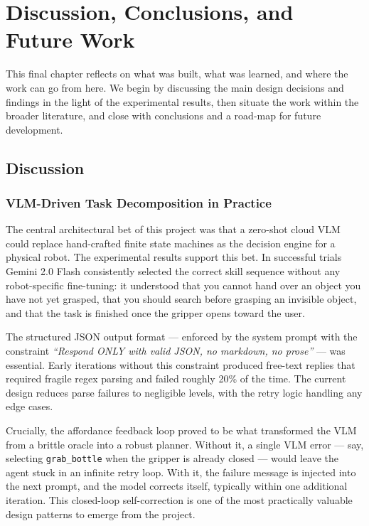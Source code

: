 \chapter{Discussion, Conclusions, and Future Work}
\label{ch:conclusion}

This final chapter reflects on what was built, what was learned, and where the work
can go from here.
We begin by discussing the main design decisions and findings in the light of the
experimental results, then situate the work within the broader literature, and close
with conclusions and a road-map for future development.

\section{Discussion}
\label{sec:discussion}

\subsection{VLM-Driven Task Decomposition in Practice}

The central architectural bet of this project was that a zero-shot cloud VLM could
replace hand-crafted finite state machines as the decision engine for a physical robot.
The experimental results support this bet.
In successful trials Gemini 2.0 Flash consistently selected the correct skill sequence
without any robot-specific fine-tuning: it understood that you cannot hand over an
object you have not yet grasped, that you should search before grasping an invisible
object, and that the task is finished once the gripper opens toward the user.

The structured JSON output format --- enforced by the system prompt with the constraint
\emph{``Respond ONLY with valid JSON, no markdown, no prose''} --- was essential.
Early iterations without this constraint produced free-text replies that required
fragile regex parsing and failed roughly 20\% of the time.
The current design reduces parse failures to negligible levels, with the retry logic
handling any edge cases.

Crucially, the affordance feedback loop proved to be what transformed the VLM from a
brittle oracle into a robust planner.
Without it, a single VLM error --- say, selecting \texttt{grab\_bottle} when the gripper
is already closed --- would leave the agent stuck in an infinite retry loop.
With it, the failure message is injected into the next prompt, and the model corrects
itself, typically within one additional iteration.
This closed-loop self-correction is one of the most practically valuable design patterns
to emerge from the project.

